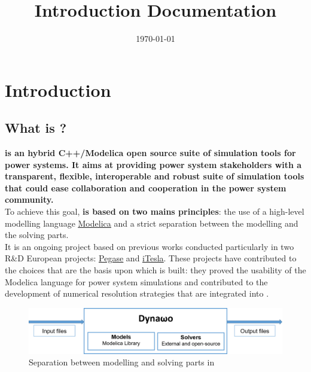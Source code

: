 \documentclass[a4paper, 12pt]{report}
\begin{document}
\title{\Dynawo Introduction Documentation}
\date\today

\maketitle
\tableofcontents

\chapter{Introduction}

\section{What is \Dynawo ?}

\textbf{\Dynawo is an hybrid C++/Modelica open source suite of simulation tools for power systems. It aims at providing power system stakeholders with a transparent, flexible, interoperable and robust suite of simulation tools that could ease collaboration and cooperation in the power system community.} \\

To achieve this goal, \textbf{\Dynawo is based on two mains principles}: the use of a high-level modelling language \href{https://modelica.org/} {\underline{Modelica}} and a strict separation between the modelling and the solving parts. \\

It is an ongoing project based on previous works conducted particularly in two R\&D European projects: \href{http://www.fp7-pegase.com/}{\underline{Pegase}} and \href{http://www.itesla-project.eu/}{\underline{iTesla}}. These projects have contributed to the choices that are the basis upon which \Dynawo is built: they proved the usability of the Modelica language for power system simulations and contributed to the development of numerical resolution strategies that are integrated into \Dynawo. \\

\begin{figure}[h!]
\centering
\includegraphics[width=\textwidth]{../resources/DynawoModelSolverLight.png}
\caption{Separation between modelling and solving parts in \Dynawo}
\end{figure}
\end{document}
